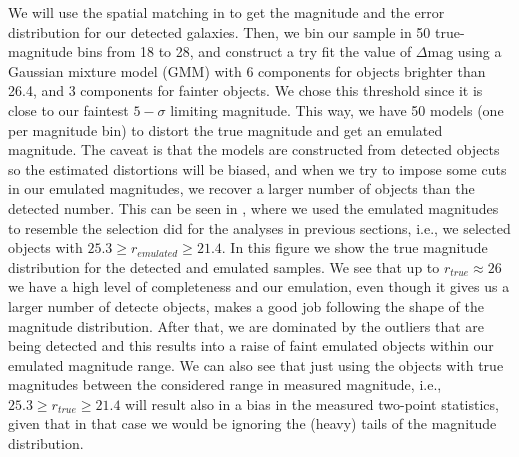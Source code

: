 \documentclass[\docopts]{\docclass}
\begin{document}
We will use the spatial matching in  to get the magnitude and the error distribution for our detected galaxies. Then, we bin our sample in 50 true-magnitude bins from 18 to 28, and construct a try fit the value of $\Delta$mag using a Gaussian mixture model (GMM) with 6 components for objects brighter than 26.4, and 3 components for fainter objects. We chose this threshold since it is close to our faintest $5-\sigma$ limiting magnitude. This way, we have 50 models (one per magnitude bin) to distort the true magnitude and get an emulated magnitude. The caveat is that the models are constructed from detected objects so the estimated distortions will be biased, and when we try to impose some cuts in our emulated magnitudes, we recover a larger number of objects than the detected number. This can be seen in , where we used the emulated magnitudes to resemble the selection did for the analyses in previous sections, i.e., we selected objects with $25.3 \geq r_{emulated} \geq 21.4$. In this figure we show the true magnitude distribution for the detected and emulated samples. We see that up to $r _{true} \approx 26$ we have a high level of completeness and our emulation, even though it gives us a larger number of detecte objects, makes a good job following the shape of the magnitude distribution. After that, we are dominated by the outliers that are being detected and this results into a raise of faint emulated objects within our emulated magnitude range. We can also see that just using the objects with true magnitudes between the considered range in measured magnitude, i.e., $25.3 \geq r_{true} \geq 21.4$ will result also in a bias in the measured two-point statistics, given that in that case we would be ignoring the (heavy) tails of the magnitude distribution. 
\end{document}
